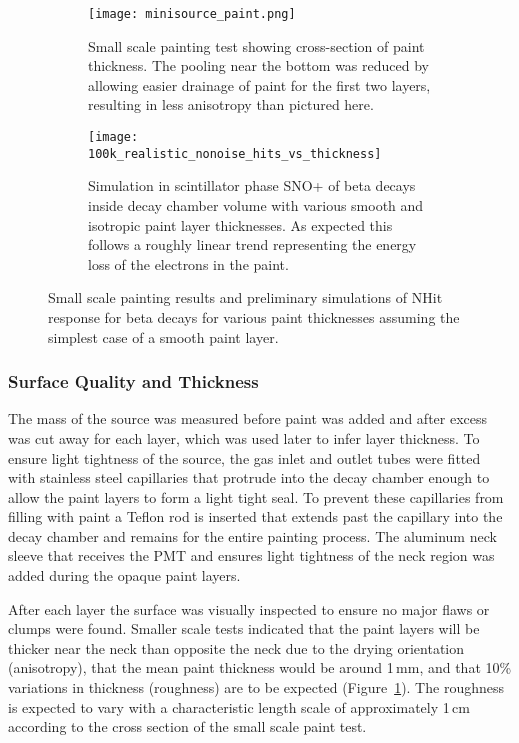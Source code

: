 \begin{figure}
\begin{subfigure}{.35\textwidth}
  \centering
  \texttt{[image: minisource\_paint.png]}
  \caption{Small scale painting test showing cross-section of paint thickness. The pooling near the bottom was reduced by allowing easier drainage of paint for the first two layers, resulting in less anisotropy than pictured here.}
  \label{fig:minisource_paint}
\end{subfigure}
\hspace{0.5cm}
\begin{subfigure}{.55\textwidth}
  \texttt{[image: 100k\_realistic\_nonoise\_hits\_vs\_thickness]}
  \caption{Simulation in scintillator phase SNO+ of \Li beta decays inside decay chamber volume with various smooth and isotropic paint layer thicknesses. As expected this follows a roughly linear trend representing the energy loss of the electrons in the paint.}
  \label{fig:meannhits}
\end{subfigure}
\caption{Small scale painting results and preliminary simulations of NHit response for \Li beta decays for various paint thicknesses assuming the simplest case of a smooth paint layer.}
\label{fig:prelimpaint}
\end{figure}

\subsubsection{Surface Quality and Thickness}

The mass of the source was measured before paint was added and after excess was cut away for each layer, which was used later to infer layer thickness. 
To ensure light tightness of the source, the gas inlet and outlet tubes were fitted with stainless steel capillaries that protrude into the decay chamber enough to allow the paint layers to form a light tight seal. 
To prevent these capillaries from filling with paint a Teflon rod is inserted that extends past the capillary into the decay chamber and remains for the entire painting process. 
The aluminum neck sleeve that receives the PMT and ensures light tightness of the neck region was added during the opaque paint layers.

After each layer the surface was visually inspected to ensure no major flaws or clumps were found. Smaller scale tests indicated that the paint layers will be thicker near the neck than opposite the neck due to the drying orientation (anisotropy), that the mean paint thickness would be around 1\,mm, and that 10\% variations in thickness (roughness) are to be expected (Figure~\ref{fig:minisource_paint}). The roughness is expected to vary with a characteristic length scale of approximately 1\,cm according to the cross section of the small scale paint test.

